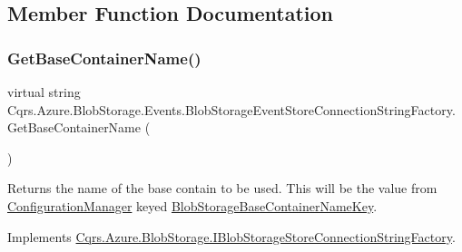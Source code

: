 \subsection{Member Function Documentation}
\mbox{\label{classCqrs_1_1Azure_1_1BlobStorage_1_1Events_1_1BlobStorageEventStoreConnectionStringFactory_a0e6aadced9c9a583884899a4c9de2f1a_a0e6aadced9c9a583884899a4c9de2f1a}} 
\subsubsection{\texorpdfstring{Get\+Base\+Container\+Name()}{GetBaseContainerName()}}
{\footnotesize\ttfamily virtual string Cqrs.\+Azure.\+Blob\+Storage.\+Events.\+Blob\+Storage\+Event\+Store\+Connection\+String\+Factory.\+Get\+Base\+Container\+Name (\begin{DoxyParamCaption}{ }\end{DoxyParamCaption})\hspace{0.3cm}{\ttfamily [virtual]}}



Returns the name of the base contain to be used. This will be the value from \hyperlink{namespaceCqrs_1_1Azure_1_1ConfigurationManager}{Configuration\+Manager} keyed \hyperlink{classCqrs_1_1Azure_1_1BlobStorage_1_1Events_1_1BlobStorageEventStoreConnectionStringFactory_affd6198f87e483bd7a6f5930a5eaa431_affd6198f87e483bd7a6f5930a5eaa431}{Blob\+Storage\+Base\+Container\+Name\+Key}. 



Implements \hyperlink{interfaceCqrs_1_1Azure_1_1BlobStorage_1_1IBlobStorageStoreConnectionStringFactory_a57145e68e3bda84bc610fa61226a850c_a57145e68e3bda84bc610fa61226a850c}{Cqrs.\+Azure.\+Blob\+Storage.\+I\+Blob\+Storage\+Store\+Connection\+String\+Factory}.




